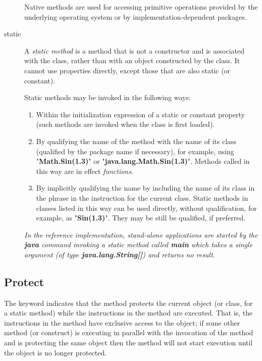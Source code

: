 \begin{description}
Native methods are used for accessing primitive operations provided by
the underlying operating system or by implementation-dependent packages.
\index{,}
\index{,}
\item[static]\label{refstatmet}

A \emph{static method} is a method that is not a constructor and is
associated with the class, rather than with an object constructed by the
class.
It cannot use properties directly, except those that are also static (or
constant).
 
Static methods may be invoked in the following ways:
\begin{enumerate}
\item Within the initialization expression of a static or constant
property (such methods are invoked when the class is first loaded).
\item By qualifying the name of the method with the name of its class
(qualified by the package name if necessary), for example, using
"\textbf{Math.Sin(1.3)}" or
"\textbf{java.lang.Math.Sin(1.3)}".
Methods called in this way are in effect \emph{functions}.
\item 
By implicitly qualifying the name by including the name of its class
in the  phrase in the  instruction for the
current class.  Static methods in classes listed in this way can be used
directly, without qualification, for example, as
"\textbf{Sin(1.3)}".
They may be still be qualified, if preferred.
\end{enumerate}
 \emph{In the reference implementation, stand-alone applications are
started by the \textbf{java} command invoking a static method
called \textbf{main} which takes a single argument (of
type \textbf{java.lang.String[]}) and returns no result.
}
\end{description}
\subsection{Protect}
 
The keyword  indicates that the method protects the
current object (or class, for a static method) while the instructions
in the method are executed.
That is, the instructions in the method have exclusive access to the
object; if some other method (or construct) is executing in
parallel with the invocation of the method and is protecting the same
object then the method will not start execution until the object is no
longer protected.
 
